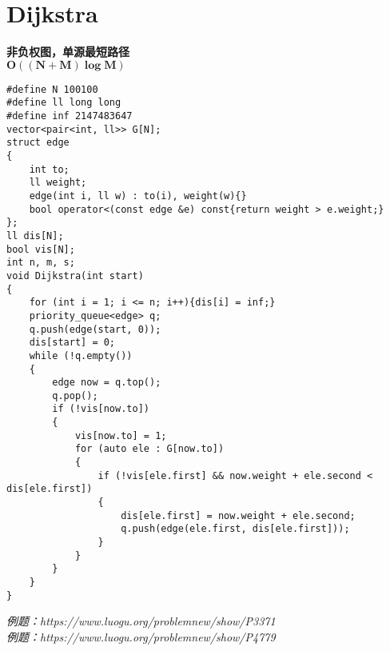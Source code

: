 \section{Dijkstra}
\textbf{非负权图，单源最短路径\\
\(
    \bm{O((N+M) \log M)}
\)
}
\begin{lstlisting}
#define N 100100
#define ll long long
#define inf 2147483647
vector<pair<int, ll>> G[N];
struct edge
{
    int to;
    ll weight;
    edge(int i, ll w) : to(i), weight(w){}
    bool operator<(const edge &e) const{return weight > e.weight;}
};
ll dis[N];
bool vis[N];
int n, m, s;
void Dijkstra(int start)
{
    for (int i = 1; i <= n; i++){dis[i] = inf;}
    priority_queue<edge> q;
    q.push(edge(start, 0));
    dis[start] = 0;
    while (!q.empty())
    {
        edge now = q.top();
        q.pop();
        if (!vis[now.to])
        {
            vis[now.to] = 1;
            for (auto ele : G[now.to])
            {
                if (!vis[ele.first] && now.weight + ele.second < dis[ele.first])
                {
                    dis[ele.first] = now.weight + ele.second;
                    q.push(edge(ele.first, dis[ele.first]));
                }
            }
        }
    }
}
\end{lstlisting}
\emph{例题：https://www.luogu.org/problemnew/show/P3371\\}
\emph{例题：https://www.luogu.org/problemnew/show/P4779}